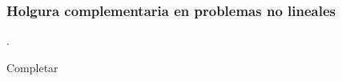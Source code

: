 \subsubsection{Holgura complementaria en problemas no lineales}.


\begin{itheorem}

\label{thm:convKKT}

Completar
\end{itheorem}